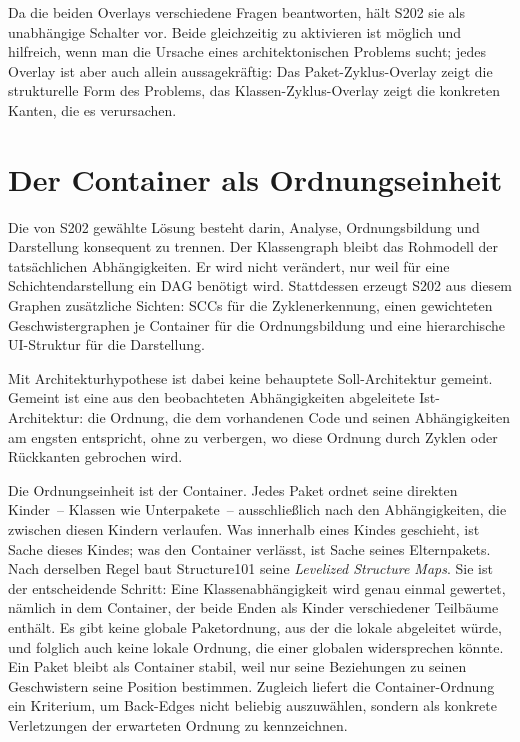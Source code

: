 \documentclass[a4paper,11pt]{article}
\begin{document}
Da die beiden Overlays verschiedene Fragen beantworten, h\"alt S202 sie als
unabh\"angige Schalter vor. Beide gleichzeitig zu aktivieren ist m\"oglich und
hilfreich, wenn man die Ursache eines architektonischen Problems sucht; jedes
Overlay ist aber auch allein aussagekr\"aftig: Das Paket-Zyklus-Overlay zeigt
die strukturelle Form des Problems, das Klassen-Zyklus-Overlay zeigt die
konkreten Kanten, die es verursachen.

\section{Der Container als Ordnungseinheit}

Die von S202 gew\"ahlte L\"osung besteht darin, Analyse, Ordnungsbildung und
Darstellung konsequent zu trennen. Der Klassengraph bleibt das Rohmodell der
tats\"achlichen Abh\"angigkeiten. Er wird nicht ver\"andert, nur weil f\"ur eine
Schichtendarstellung ein DAG ben\"otigt wird. Stattdessen erzeugt S202 aus
diesem Graphen zus\"atzliche Sichten: SCCs f\"ur die Zyklenerkennung, einen
gewichteten Geschwistergraphen je Container f\"ur die Ordnungsbildung und eine
hierarchische UI-Struktur f\"ur die Darstellung.

Mit Architekturhypothese ist dabei keine behauptete Soll-Architektur gemeint.
Gemeint ist eine aus den beobachteten Abh\"angigkeiten abgeleitete
Ist-Architektur: die Ordnung, die dem vorhandenen Code und seinen
Abh\"angigkeiten am engsten entspricht, ohne zu verbergen, wo diese Ordnung
durch Zyklen oder R\"uckkanten gebrochen wird.

Die Ordnungseinheit ist der Container. Jedes Paket ordnet seine direkten
Kinder~-- Klassen wie Unterpakete~-- ausschlie\ss{}lich nach den
Abh\"angigkeiten, die zwischen diesen Kindern verlaufen. Was innerhalb eines
Kindes geschieht, ist Sache dieses Kindes; was den Container verl\"asst, ist
Sache seines Elternpakets. Nach derselben Regel baut Structure101 seine
\emph{Levelized Structure Maps}. Sie ist der entscheidende Schritt: Eine
Klassenabh\"angigkeit wird genau einmal gewertet, n\"amlich in dem Container,
der beide Enden als Kinder verschiedener Teilb\"aume enth\"alt. Es gibt keine
globale Paketordnung, aus der die lokale abgeleitet w\"urde, und folglich auch
keine lokale Ordnung, die einer globalen widersprechen k\"onnte. Ein Paket
bleibt als Container stabil, weil nur seine Beziehungen zu seinen Geschwistern
seine Position bestimmen. Zugleich liefert die Container-Ordnung ein Kriterium,
um Back-Edges nicht beliebig auszuw\"ahlen, sondern als konkrete Verletzungen
der erwarteten Ordnung zu kennzeichnen.
\end{document}
